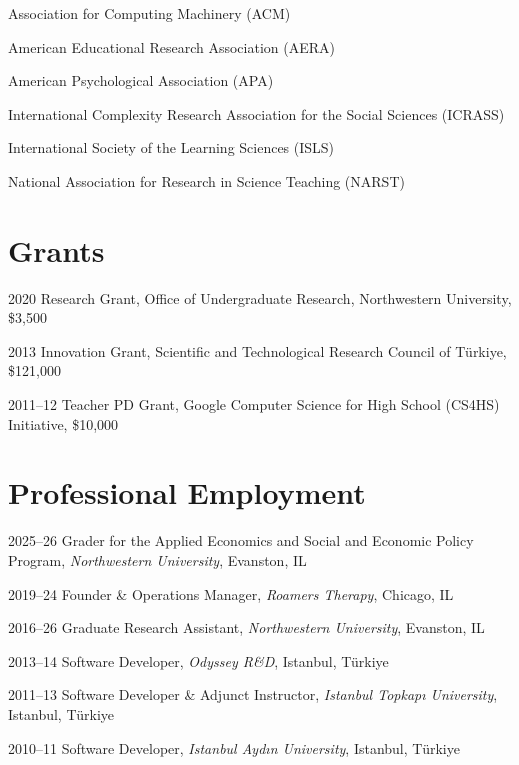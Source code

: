 \documentclass[11pt,letterpaper]{report} %
\newcommand{\listitemspace}{0.25em}
\renewenvironment{itemize}
{\begin{list}{}{\setlength{\leftmargin}{0em}
                \setlength{\parskip}{0em}
                \setlength{\itemsep}{\listitemspace}
                \setlength{\parsep}{\listitemspace}}}
{\end{list}}
\begin{document}
    \begin{itemize}

        \item Association for Computing Machinery (ACM)
        \item American Educational Research Association (AERA)
        \item American Psychological Association (APA)
        \item International Complexity Research Association for the Social Sciences (ICRASS)
        \item International Society of the Learning Sciences (ISLS)
        \item National Association for Research in Science Teaching (NARST)

    \end{itemize}


    \section*{Grants}

    \begin{tablist}

        \item[2020] \tab{}Research Grant, Office of Undergraduate Research, Northwestern University, \$3,500
        \item[2013] \tab{}Innovation Grant, Scientific and Technological Research Council of Türkiye, \$121,000
        \item[2011--12] \tab{}Teacher PD Grant, Google Computer Science for High School (CS4HS) Initiative, \$10,000

    \end{tablist}



    \section*{Professional Employment}

    \begin{tablist}

        \item[2025--26] \tab{}Grader for the Applied Economics and Social and Economic Policy Program, \textit{Northwestern University}, Evanston, IL
        \item[2019--24] \tab{}Founder \& Operations Manager, \textit{Roamers Therapy}, Chicago, IL
        \item[2016--26] \tab{}Graduate Research Assistant, \textit{Northwestern University}, Evanston, IL
        \item[2013--14] \tab{}Software Developer, \textit{Odyssey R\&D}, Istanbul, Türkiye
        \item[2011--13] \tab{}Software Developer \& Adjunct Instructor, \textit{Istanbul Topkapı University}, Istanbul, Türkiye
        \item[2010--11] \tab{}Software Developer, \textit{Istanbul Aydın University}, Istanbul, Türkiye

    \end{tablist}
\end{document}
